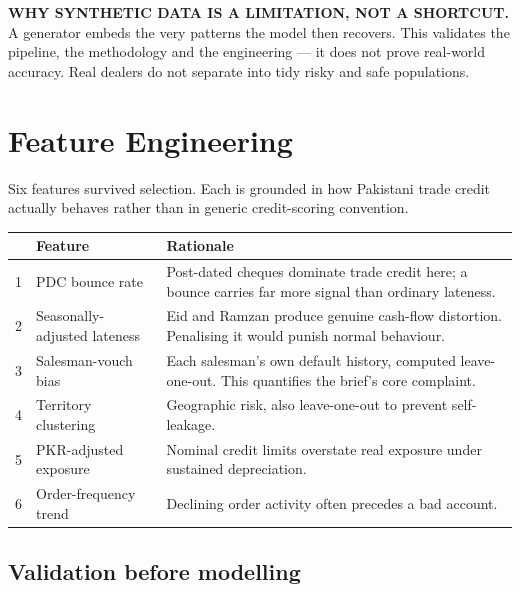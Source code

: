 \documentclass[11pt,a4paper]{article}
\newcommand{\lab}[1]{{\color{navy}\bfseries\footnotesize #1}}
\begin{document}
\begin{callout}
\lab{WHY SYNTHETIC DATA IS A LIMITATION, NOT A SHORTCUT.} A generator embeds the
very patterns the model then recovers. This validates the pipeline, the
methodology and the engineering --- it does not prove real-world accuracy. Real
dealers do not separate into tidy risky and safe populations.
\end{callout}

\section{Feature Engineering}

Six features survived selection. Each is grounded in how Pakistani trade credit
actually behaves rather than in generic credit-scoring convention.

\vspace{2pt}
\begin{tabularx}{\textwidth}{@{}p{0.6cm}>{\RaggedRight\arraybackslash}p{4.4cm}>{\RaggedRight\arraybackslash}X@{}}
\toprule
& \textbf{Feature} & \textbf{Rationale} \\
\midrule
1 & PDC bounce rate & Post-dated cheques dominate trade credit here; a bounce
                      carries far more signal than ordinary lateness. \\
2 & Seasonally-adjusted lateness & Eid and Ramzan produce genuine cash-flow
                      distortion. Penalising it would punish normal behaviour. \\
3 & Salesman-vouch bias & Each salesman's own default history, computed
                      leave-one-out. This quantifies the brief's core complaint. \\
4 & Territory clustering & Geographic risk, also leave-one-out to prevent
                      self-leakage. \\
5 & PKR-adjusted exposure & Nominal credit limits overstate real exposure under
                      sustained depreciation. \\
6 & Order-frequency trend & Declining order activity often precedes a bad
                      account. \\
\bottomrule
\end{tabularx}

\subsection{Validation before modelling}
\end{document}
